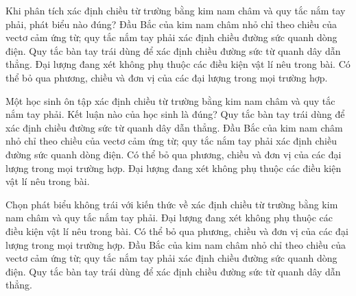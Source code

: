 \begin{ex}
Khi phân tích xác định chiều từ trường bằng kim nam châm và quy tắc nắm tay phải, phát biểu nào đúng?
\choice
{\True Đầu Bắc của kim nam châm nhỏ chỉ theo chiều của vectơ cảm ứng từ; quy tắc nắm tay phải xác định chiều đường sức quanh dòng điện.}
{Quy tắc bàn tay trái dùng để xác định chiều đường sức từ quanh dây dẫn thẳng.}
{Đại lượng đang xét không phụ thuộc các điều kiện vật lí nêu trong bài.}
{Có thể bỏ qua phương, chiều và đơn vị của các đại lượng trong mọi trường hợp.}
\end{ex}

\begin{ex}
Một học sinh ôn tập xác định chiều từ trường bằng kim nam châm và quy tắc nắm tay phải. Kết luận nào của học sinh là đúng?
\choice
{Quy tắc bàn tay trái dùng để xác định chiều đường sức từ quanh dây dẫn thẳng.}
{\True Đầu Bắc của kim nam châm nhỏ chỉ theo chiều của vectơ cảm ứng từ; quy tắc nắm tay phải xác định chiều đường sức quanh dòng điện.}
{Có thể bỏ qua phương, chiều và đơn vị của các đại lượng trong mọi trường hợp.}
{Đại lượng đang xét không phụ thuộc các điều kiện vật lí nêu trong bài.}
\end{ex}

\begin{ex}
Chọn phát biểu không trái với kiến thức về xác định chiều từ trường bằng kim nam châm và quy tắc nắm tay phải.
\choice
{Đại lượng đang xét không phụ thuộc các điều kiện vật lí nêu trong bài.}
{Có thể bỏ qua phương, chiều và đơn vị của các đại lượng trong mọi trường hợp.}
{\True Đầu Bắc của kim nam châm nhỏ chỉ theo chiều của vectơ cảm ứng từ; quy tắc nắm tay phải xác định chiều đường sức quanh dòng điện.}
{Quy tắc bàn tay trái dùng để xác định chiều đường sức từ quanh dây dẫn thẳng.}
\end{ex}

